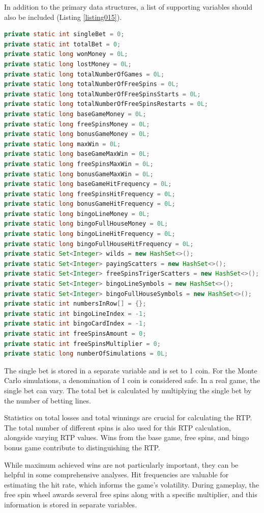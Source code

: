 \documentclass[12pt,twoside,openany]{book}
\begin{document}
In addition to the primary data structures, a list of supporting variables should also be included (Listing \ref{listing015}).

\begin{lstlisting}[language=Java, caption={List of supportive variables}, label=listing015]
private static int singleBet = 0;
private static int totalBet = 0;
private static long wonMoney = 0L;
private static long lostMoney = 0L;
private static long totalNumberOfGames = 0L;
private static long totalNumberOfFreeSpins = 0L;
private static long totalNumberOfFreeSpinsStarts = 0L;
private static long totalNumberOfFreeSpinsRestarts = 0L;
private static long baseGameMoney = 0L;
private static long freeSpinsMoney = 0L;
private static long bonusGameMoney = 0L;
private static long maxWin = 0L;
private static long baseGameMaxWin = 0L;
private static long freeSpinsMaxWin = 0L;
private static long bonusGameMaxWin = 0L;
private static long baseGameHitFrequency = 0L;
private static long freeSpinsHitFrequency = 0L;
private static long bonusGameHitFrequency = 0L;
private static long bingoLineMoney = 0L;
private static long bingoFullHouseMoney = 0L;
private static long bingoLineHitFrequency = 0L;
private static long bingoFullHouseHitFrequency = 0L;
private static Set<Integer> wilds = new HashSet<>();
private static Set<Integer> payingScatters = new HashSet<>();
private static Set<Integer> freeSpinsTrigerScatters = new HashSet<>();
private static Set<Integer> bingoLineSymbols = new HashSet<>();
private static Set<Integer> bingoFullHouseSymbols = new HashSet<>();
private static int numbersInRow[] = {};
private static int bingoLineIndex = -1;
private static int bingoCardIndex = -1;
private static int freeSpinsAmount = 0;
private static int freeSpinsMultiplier = 0;
private static long numberOfSimulations = 0L;
\end{lstlisting}

The single bet is stored in a separate variable and is set to 1 coin. For the Monte Carlo simulations, a denomination of 1 coin is considered safe. In a real game, the single bet can vary. The total bet is calculated by multiplying the single bet by the number of betting lines.

Statistics on total losses and total winnings are crucial for calculating the RTP. The total number of different spins is also used for this RTP calculation, alongside varying RTP values. Wins from the base game, free spins, and bingo bonus game contribute to distinguishing the RTP.

While maximum achieved wins are not particularly important, they can be helpful in some comprehensive analyses. Hit frequencies are valuable for estimating the hit rate, which informs the game's volatility. During gameplay, the free spin wheel awards several free spins along with a specific multiplier, and this information is stored in separate variables.
\end{document}

